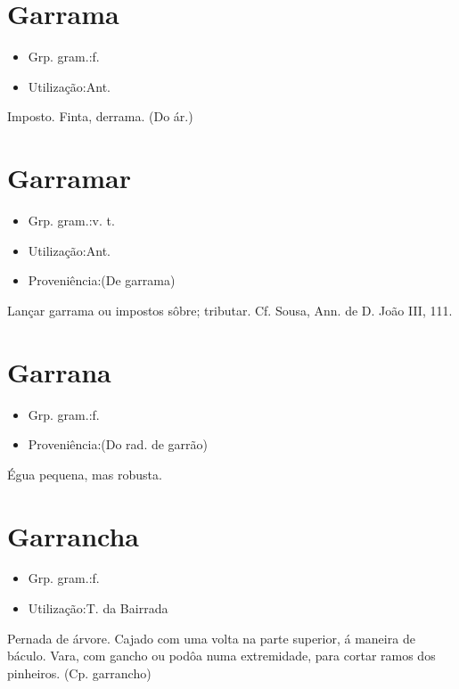 \section{Garrama}
\begin{itemize}
\item {Grp. gram.:f.}
\end{itemize}
\begin{itemize}
\item {Utilização:Ant.}
\end{itemize}
Imposto.
Finta, derrama.
(Do ár.)
\section{Garramar}
\begin{itemize}
\item {Grp. gram.:v. t.}
\end{itemize}
\begin{itemize}
\item {Utilização:Ant.}
\end{itemize}
\begin{itemize}
\item {Proveniência:(De \textunderscore garrama\textunderscore )}
\end{itemize}
Lançar garrama ou impostos sôbre; tributar. Cf. Sousa, \textunderscore Ann. de D. João III\textunderscore , 111.
\section{Garrana}
\begin{itemize}
\item {Grp. gram.:f.}
\end{itemize}
\begin{itemize}
\item {Proveniência:(Do rad. de \textunderscore garrão\textunderscore )}
\end{itemize}
Égua pequena, mas robusta.
\section{Garrancha}
\begin{itemize}
\item {Grp. gram.:f.}
\end{itemize}
\begin{itemize}
\item {Utilização:T. da Bairrada}
\end{itemize}
Pernada de árvore.
Cajado com uma volta na parte superior, á maneira de báculo.
Vara, com gancho ou podôa numa extremidade, para cortar ramos dos pinheiros.
(Cp. \textunderscore garrancho\textunderscore )
